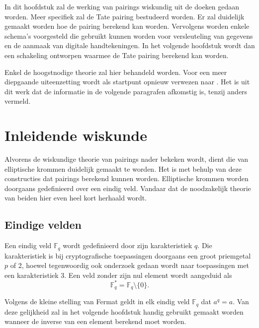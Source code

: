 
In dit hoofdstuk zal de werking van pairings wiskundig uit de doeken gedaan worden. Meer specifiek zal de Tate pairing bestudeerd worden. Er zal duidelijk gemaakt worden hoe de pairing berekend kan worden. Vervolgens worden enkele schema's voorgesteld die gebruikt kunnen worden voor versleuteling van gegevens en de aanmaak van digitale handtekeningen. In het volgende hoofdstuk wordt dan een schakeling ontworpen waarmee de Tate pairing berekend kan worden.

Enkel de hoogstnodige theorie zal hier behandeld worden. Voor een meer diepgaande uiteenzetting wordt als startpunt opnieuw verwezen naar \cite{maas}. Het is uit dit werk dat de informatie in de volgende paragrafen afkomstig is, tenzij anders vermeld.

\section{Inleidende wiskunde}

Alvorens de wiskundige theorie van pairings nader bekeken wordt, dient die van elliptische krommen duidelijk gemaakt te worden. Het is met behulp van deze constructies dat pairings berekend kunnen worden. Elliptische krommen worden doorgaans gedefinieerd over een eindig veld. Vandaar dat de noodzakelijk theorie van beiden hier even heel kort herhaald wordt.

\subsection{Eindige velden}

Een eindig veld $\mathbb{F}_q$ wordt gedefinieerd door zijn karakteristiek $q$. Die karakteristiek is bij cryptografische toepassingen doorgaans een groot priemgetal $p$ of 2, hoewel tegenwoordig ook onderzoek gedaan wordt naar toepassingen met een karakteristiek 3. Een veld zonder zijn nul element wordt aangeduid als
\[\mathbb{F}_q^* = \mathbb{F}_q \setminus \{ 0 \}.\]

Volgens de kleine stelling van Fermat geldt in elk eindig veld $\mathbb{F}_q$ dat $a^q = a$. Van deze gelijkheid zal in het volgende hoofdstuk handig gebruikt gemaakt worden wanneer de inverse van een element berekend moet worden.


